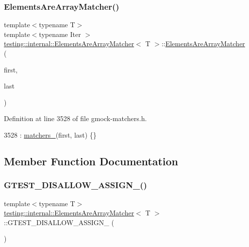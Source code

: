 \subsubsection{\texorpdfstring{Elements\+Are\+Array\+Matcher()}{ElementsAreArrayMatcher()}}
{\footnotesize\ttfamily template$<$typename T$>$ \\
template$<$typename Iter $>$ \\
\hyperlink{classtesting_1_1internal_1_1ElementsAreArrayMatcher}{testing\+::internal\+::\+Elements\+Are\+Array\+Matcher}$<$ T $>$\+::\hyperlink{classtesting_1_1internal_1_1ElementsAreArrayMatcher}{Elements\+Are\+Array\+Matcher} (\begin{DoxyParamCaption}\item[{Iter}]{first,  }\item[{Iter}]{last }\end{DoxyParamCaption})\hspace{0.3cm}{\ttfamily [inline]}}



Definition at line 3528 of file gmock-\/matchers.\+h.


\begin{DoxyCode}
3528 : \hyperlink{classtesting_1_1internal_1_1ElementsAreArrayMatcher_af28db07928ad4eb3128d553757ed712c}{matchers\_}(first, last) \{\}
\end{DoxyCode}


\subsection{Member Function Documentation}
\mbox{\label{classtesting_1_1internal_1_1ElementsAreArrayMatcher_aa8d3686a9b297a93fa0ada490a7501f6}} 
\subsubsection{\texorpdfstring{G\+T\+E\+S\+T\+\_\+\+D\+I\+S\+A\+L\+L\+O\+W\+\_\+\+A\+S\+S\+I\+G\+N\+\_\+()}{GTEST\_DISALLOW\_ASSIGN\_()}}
{\footnotesize\ttfamily template$<$typename T$>$ \\
\hyperlink{classtesting_1_1internal_1_1ElementsAreArrayMatcher}{testing\+::internal\+::\+Elements\+Are\+Array\+Matcher}$<$ T $>$\+::G\+T\+E\+S\+T\+\_\+\+D\+I\+S\+A\+L\+L\+O\+W\+\_\+\+A\+S\+S\+I\+G\+N\+\_\+ (\begin{DoxyParamCaption}\item[{\hyperlink{classtesting_1_1internal_1_1ElementsAreArrayMatcher}{Elements\+Are\+Array\+Matcher}$<$ T $>$}]{ }\end{DoxyParamCaption})\hspace{0.3cm}{\ttfamily [private]}}

